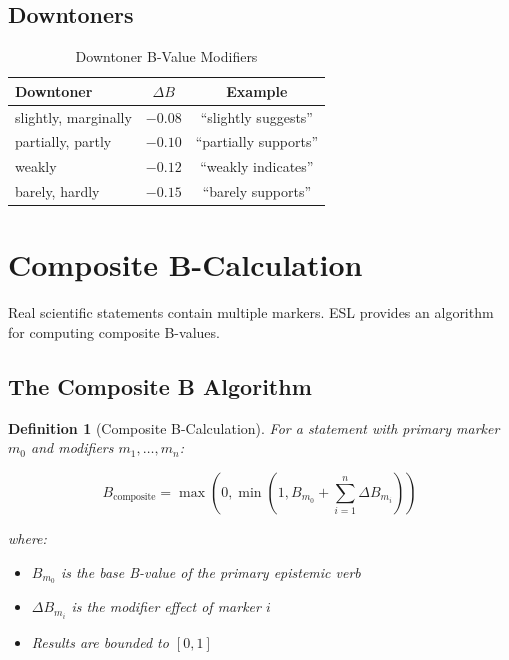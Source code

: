 \documentclass[11pt,a4paper]{article}
\newtheorem{definition}{Definition}[section]
\theoremstyle{remark}
\begin{document}
\subsection{Downtoners}

\begin{table}[h]
\centering
\caption{Downtoner B-Value Modifiers}
\label{tab:downtoners}
\begin{tabular}{lcc}
\toprule
\textbf{Downtoner} & \textbf{$\Delta B$} & \textbf{Example} \\
\midrule
slightly, marginally & $-0.08$ & ``slightly suggests'' \\
partially, partly & $-0.10$ & ``partially supports'' \\
weakly & $-0.12$ & ``weakly indicates'' \\
barely, hardly & $-0.15$ & ``barely supports'' \\
\bottomrule
\end{tabular}
\end{table}


\section{Composite B-Calculation}
\label{sec:composite}

Real scientific statements contain multiple markers. ESL provides an algorithm for computing composite B-values.

\subsection{The Composite B Algorithm}

\begin{definition}[Composite B-Calculation]
\label{def:composite-b}
For a statement with primary marker $m_0$ and modifiers $m_1, \ldots, m_n$:

\begin{equation}
B_{\text{composite}} = \max\left(0, \min\left(1, B_{m_0} + \sum_{i=1}^{n} \Delta B_{m_i}\right)\right)
\end{equation}

where:
\begin{itemize}
    \item $B_{m_0}$ is the base B-value of the primary epistemic verb
    \item $\Delta B_{m_i}$ is the modifier effect of marker $i$
    \item Results are bounded to $[0, 1]$
\end{itemize}
\end{definition}
\end{document}
